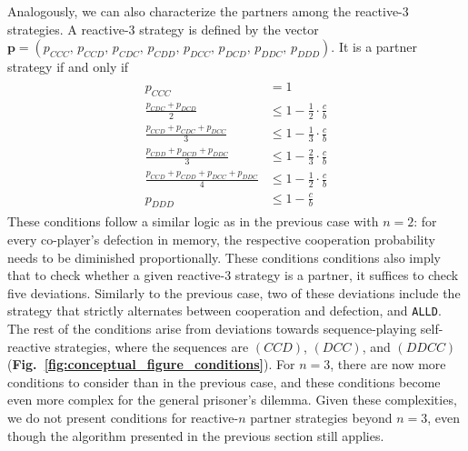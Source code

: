 \documentclass[9pt,twocolumn,twoside]{pnas-new}
\newcommand{\figref}[1]{{\textbf{Fig.~\ref{#1}}}}
\def\alld{\texttt{ALLD}}
\begin{document}
Analogously, we can also characterize the partners among the reactive-3 strategies. 
A reactive-3 strategy is defined by the vector 
$
\mathbf{p} = (p_{CCC},\, p_{CCD},\, p_{CDC},\, p_{CDD},\, p_{DCC},\, p_{DCD},\, p_{DDC},\, p_{DDD}).
$
It is a partner strategy if and only if
\begin{align}\label{eq:three_bit_conditions}
\begin{split}
p_{CCC} & = 1 \\[0.2cm]
\frac{p_{CDC} + p_{DCD}}{2} & \leq 1 - \frac{1}{2} \cdot \frac{c}{b} \\[0.2cm]
\frac{p_{CCD} + p_{CDC} + p_{DCC}}{3} & \leq 1 - \frac{1}{3} \cdot \frac{c}{b} \\[0.2cm]
\frac{p_{CDD} + p_{DCD} + p_{DDC}}{3} & \leq 1 - \frac{2}{3} \cdot \frac{c}{b} \\[0.2cm]
\frac{p_{CCD} + p_{CDD} + p_{DCC} + p_{DDC}}{4}  & \leq 1 - \frac{1}{2} \cdot \frac{c}{b}  \\[0.2cm]
p_{DDD} & \leq 1\!-\! \frac{c}{b}
\end{split}
\end{align}
These conditions follow a similar logic as in the previous case with $n\!=\!2$:
for every co-player's defection in memory, the respective cooperation
probability needs to be diminished proportionally. These conditions
conditions also imply that to check whether a given reactive-3 strategy is a
partner, it suffices to check five deviations. Similarly to the previous case,
two of these deviations include the strategy that strictly alternates between
cooperation and defection, and \alld. The rest of the conditions arise from
deviations towards sequence-playing self-reactive strategies, where the
sequences are \((CCD)\), \((DCC)\), and \((DDCC)\) (\figref{fig:conceptual_figure_conditions}).
For $n\!=\!3$, there are now more conditions to consider than in the previous
case, and these conditions become even more complex for the general prisoner's
dilemma. Given these complexities, we do not present conditions for reactive-$n$
partner strategies beyond $n\!=\!3$, even though the algorithm presented in the
previous section still applies.\\

\end{document}
